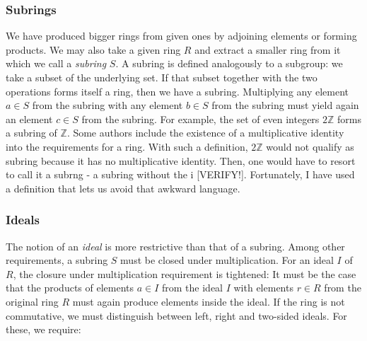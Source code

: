







\subsubsection{Subrings}
We have produced bigger rings from given ones by adjoining elements or forming products. We may also take a given ring $R$ and extract a smaller ring from it which we call a \emph{subring} $S$. A subring is defined analogously to a subgroup: we take a subset of the underlying set. If that subset together with the two operations forms itself a ring, then we have a subring. Multiplying any element $a \in S$ from the subring with any element $b \in S$ from the subring must yield again an element $c \in S$ from the subring. For example, the set of even integers $2 \mathbb{Z}$ forms a subring of $\mathbb{Z}$. Some authors include the existence of a multiplicative identity into the requirements for a ring. With such a definition, $2 \mathbb{Z}$ would not qualify as subring because it has no multiplicative identity. Then, one would have to resort to call it a subrng - a subring without the i [VERIFY!]. Fortunately, I have used a definition that lets us avoid that awkward language.


\subsubsection{Ideals}
The notion of an \emph{ideal} is more restrictive than that of a subring. Among other requirements, a subring $S$ must be closed under multiplication. For an ideal $I$ of $R$, the closure under multiplication requirement is tightened: It must be the case that the products of elements $a \in I$ from the ideal $I$ with elements $r \in R$ from the original ring $R$ must again produce elements inside the ideal. If the ring is not commutative, we must distinguish between left, right and two-sided ideals. For these, we require:

